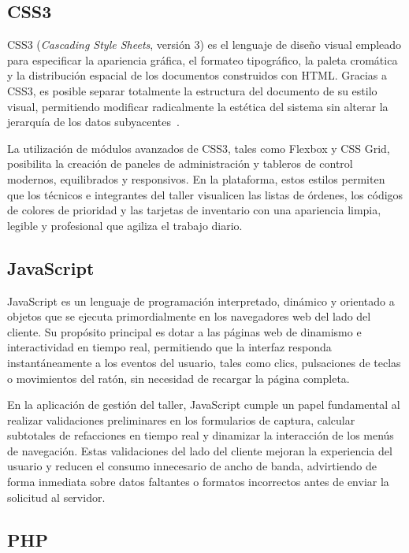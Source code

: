 \subsection{CSS3}

CSS3 (\textit{Cascading Style Sheets}, versión 3) es el lenguaje de diseño visual empleado para especificar la apariencia gráfica, el formateo tipográfico, la paleta cromática y la distribución espacial de los documentos construidos con HTML. Gracias a CSS3, es posible separar totalmente la estructura del documento de su estilo visual, permitiendo modificar radicalmente la estética del sistema sin alterar la jerarquía de los datos subyacentes~\cite{mdn_web_dev}.

La utilización de módulos avanzados de CSS3, tales como Flexbox y CSS Grid, posibilita la creación de paneles de administración y tableros de control modernos, equilibrados y responsivos. En la plataforma, estos estilos permiten que los técnicos e integrantes del taller visualicen las listas de órdenes, los códigos de colores de prioridad y las tarjetas de inventario con una apariencia limpia, legible y profesional que agiliza el trabajo diario.

\subsection{JavaScript}

JavaScript es un lenguaje de programación interpretado, dinámico y orientado a objetos que se ejecuta primordialmente en los navegadores web del lado del cliente. Su propósito principal es dotar a las páginas web de dinamismo e interactividad en tiempo real, permitiendo que la interfaz responda instantáneamente a los eventos del usuario, tales como clics, pulsaciones de teclas o movimientos del ratón, sin necesidad de recargar la página completa.

En la aplicación de gestión del taller, JavaScript cumple un papel fundamental al realizar validaciones preliminares en los formularios de captura, calcular subtotales de refacciones en tiempo real y dinamizar la interacción de los menús de navegación. Estas validaciones del lado del cliente mejoran la experiencia del usuario y reducen el consumo innecesario de ancho de banda, advirtiendo de forma inmediata sobre datos faltantes o formatos incorrectos antes de enviar la solicitud al servidor.

\subsection{PHP}

